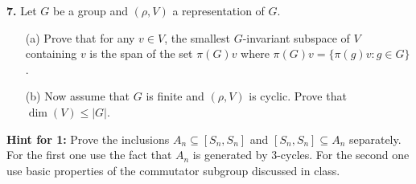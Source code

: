 \documentclass[12pt]{amsart}
\begin{document}
{\bf 7.} Let $G$ be a group and $(\rho,V)$ a representation of $G$. 
\begin{itemize}
\item[(a)] Prove that for any $v\in V$, the smallest $G$-invariant subspace of $V$ containing $v$ 
is the span of the set $\pi(G)v$ where $\pi(G)v=\{\pi(g)v: g\in G\}$.
\item[(b)] Now assume that $G$ is finite and $(\rho,V)$ is cyclic. Prove that $\dim(V)\leq |G|$.
\end{itemize}
\newpage
{\bf Hint for 1:} Prove the inclusions $A_n\subseteq [S_n,S_n]$ and $[S_n,S_n]\subseteq A_n$ separately. For the first one use the fact that $A_n$ is generated by $3$-cycles. For the second one use basic properties of the commutator subgroup discussed in class. 
\end{document}
